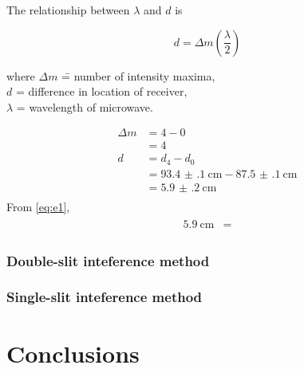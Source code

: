 \documentclass[letter,12pt]{article}
\newcommand{\tlambda}{\(\lambda\) }
\numberwithin{equation}{section}
\numberwithin{figure}{section}
\numberwithin{table}{section}
\begin{document}
The relationship between \tlambda and \(d\) is

\begin{equation} \label{eq:e1}
  d = \Delta m \left( \frac{\lambda}{2} \right)
\end{equation}

\begin{tabbing}
  where \= \(\Delta m\) \= = number of intensity maxima, \\
  \> \(d\) \> = difference in location of receiver, \\
  \> \tlambda \> = wavelength of microwave.
\end{tabbing}

\begin{align*}
  \Delta m &= 4 - 0 \\
  &= 4 \\
  d &= d_4 - d_0 \\
  &= \SI{93.4(1)}{\cm} - \SI{87.5(1)}{\cm} \\
  &= \SI{5.9(2)}{\cm} \\
\end{align*}
From \eqref{eq:e1},
\begin{align*}
  \begin{split}
    \SI{5.9}{\cm} &= 
  \end{split}
\end{align*}

\subsubsection{Double-slit inteference method}

\subsubsection{Single-slit inteference method}

\section{Conclusions}
\end{document}
